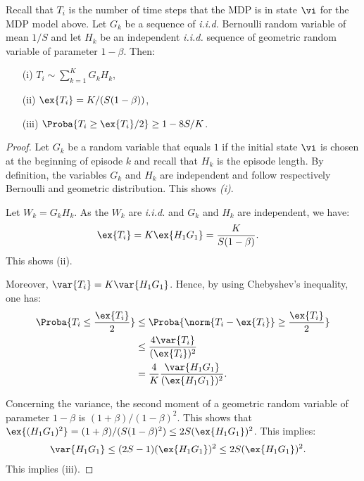 \begin{lem}
    \label{lem:concentration_T_i}
    Recall that $T_i$ is the number of time steps that the MDP is in state $\vi$ for the MDP model above. Let $G_k$ be a sequence of \emph{i.i.d.} Bernoulli random variable of mean $1/S$ and let $H_k$ be an independent \emph{i.i.d.} sequence of geometric random variable of parameter $1-\beta$. Then:
    \begin{itemize}
        \item[(i)] $T_i\sim\sum_{k=1}^K G_k H_k$,
        \item[(ii)] $\ex{T_i} = K/(S(1-\beta))$,
        \item[(iii)] $\Proba{T_i \ge \ex{T_i}/2} \ge 1-8S/K$. 
    \end{itemize}
\end{lem}
\begin{proof}
    Let $G_k$ be a random variable that equals $1$ if the initial state $\vi$ is chosen at the beginning of episode $k$ and recall that $H_k$ is the episode length. By definition, the variables $G_k$ and $H_k$ are independent and follow respectively Bernoulli and geometric distribution. This shows \emph{(i)}. 
    
    Let $W_k=G_kH_k$. As the $W_k$ are \emph{i.i.d.} and $G_k$ and $H_k$ are independent, we have: 
    \begin{align*}
        \ex{T_i} = K\ex{H_1G_1} &= \frac{K}{S(1-\beta)}.
    \end{align*}
    This shows (ii). 
    
    Moreover, $\var{T_i} = K\var{H_1G_1}$. Hence, by using Chebyshev's inequality, one has:
    \begin{align*}
        \Proba{T_i \le \frac{\ex{T_i}}{2}} &\le \Proba{\norm{T_i-\ex{T_i}} \ge \frac{\ex{T_i}}{2}}\\
        &\le \frac{4\var{T_i}}{(\ex{T_i})^2}\\
        &= \frac{4}{K} \frac{\var{H_1G_1}}{(\ex{H_1G_1})^2}.
    \end{align*}
    
    
    Concerning the variance, the second moment of a geometric random variable of parameter $1-\beta$ is $(1+\beta)/(1-\beta)^2$. This shows that $\ex{(H_1G_1)^2}=(1+\beta)/(S(1-\beta)^2)\le 2S(\ex{H_1G_1})^2$. This implies:
    \begin{align*}
        \var{H_1G_1} &\le (2S-1)(\ex{H_1G_1})^2\le 2S(\ex{H_1G_1})^2.        
    \end{align*}
    This implies (iii).
\end{proof}


